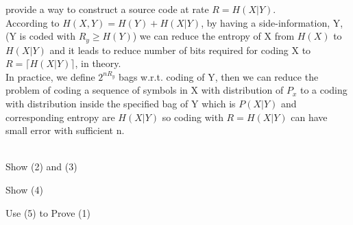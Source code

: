 \documentclass[
  course = {{EE623 Information Theory}},
  quartile = {{3}},
  assignment = 4,
  name = {{Mohammad Mahdi Rahimi}},
  studentnumber = {{20208244}},
  email = {{mahi@kaist.ac.kr}},
  firstexercise = 1
]{aga-homework}
\begin{document}
\exercise
\subexercise provide a way to construct a source code at rate $R = H(X|Y)$.\\


According to $H(X,Y) = H(Y) + H(X|Y)$, by having a side-information, Y, (Y is coded with $R_y \ge H(Y)$) we can reduce the entropy of X from $H(X)$ to $H(X|Y)$ and it leads to reduce number of bits required for coding X to $R = \lceil H(X|Y) \rceil$, in theory.\\

In practice, we define $2^{nR_y}$ bags w.r.t. coding of Y, then we can reduce the problem of coding a sequence of symbols in X with distribution of $P_x$ to a coding with distribution inside the specified bag of Y which is $P(X|Y)$ and corresponding entropy are $H(X|Y)$ so coding with $R = H(X|Y)$ can have small error with sufficient n.

\\
\exercise
\subexercise Show (2) and (3)


\subexercise Show (4)

\subexercise Use (5) to Prove (1)
\end{document}
